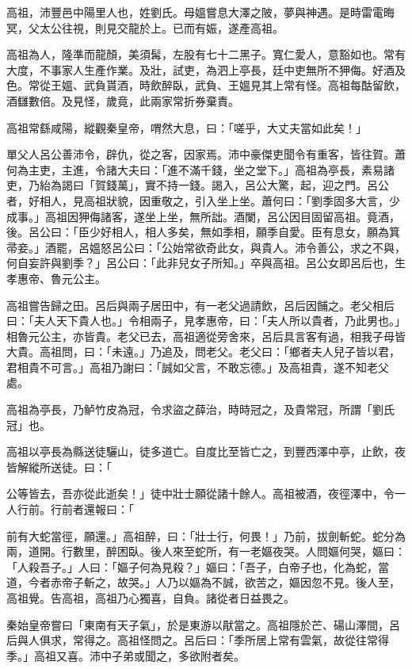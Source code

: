 
\begin{pinyinscope}
高祖，沛豐邑中陽里人也，姓劉氏。母媼嘗息大澤之陂，夢與神遇。是時雷電晦冥，父太公往視，則見交龍於上。已而有娠，遂產高祖。

高祖為人，隆準而龍顏，美須髯，左股有七十二黑子。寬仁愛人，意豁如也。常有大度，不事家人生產作業。及壯，試吏，為泗上亭長，廷中吏無所不狎侮。好酒及色。常從王媼、武負貰酒，時飲醉臥，武負、王媼見其上常有怪。高祖每酤留飲，酒讎數倍。及見怪，歲竟，此兩家常折券棄責。

高祖常繇咸陽，縱觀秦皇帝，喟然大息，曰：「嗟乎，大丈夫當如此矣！」

單父人呂公善沛令，辟仇，從之客，因家焉。沛中豪傑吏聞令有重客，皆往賀。蕭何為主吏，主進，令諸大夫曰：「進不滿千錢，坐之堂下。」高祖為亭長，素易諸吏，乃紿為謁曰「賀錢萬」，實不持一錢。謁入，呂公大驚，起，迎之門。呂公者，好相人，見高祖狀貌，因重敬之，引入坐上坐。蕭何曰：「劉季固多大言，少成事。」高祖因狎侮諸客，遂坐上坐，無所詘。酒闌，呂公因目固留高祖。竟酒，後。呂公曰：「臣少好相人，相人多矣，無如季相，願季自愛。臣有息女，願為箕帚妾。」酒罷，呂媼怒呂公曰：「公始常欲奇此女，與貴人。沛令善公，求之不與，何自妄許與劉季？」呂公曰：「此非兒女子所知。」卒與高祖。呂公女即呂后也，生孝惠帝、魯元公主。

高祖嘗告歸之田。呂后與兩子居田中，有一老父過請飲，呂后因餔之。老父相后曰：「夫人天下貴人也。」令相兩子，見孝惠帝，曰：「夫人所以貴者，乃此男也。」相魯元公主，亦皆貴。老父已去，高祖適從旁舍來，呂后具言客有過，相我子母皆大貴。高祖問，曰：「未遠。」乃追及，問老父。老父曰：「鄉者夫人兒子皆以君，君相貴不可言。」高祖乃謝曰：「誠如父言，不敢忘德。」及高祖貴，遂不知老父處。

高祖為亭長，乃鲈竹皮為冠，令求盜之薛治，時時冠之，及貴常冠，所謂「劉氏冠」也。

高祖以亭長為縣送徒驪山，徒多道亡。自度比至皆亡之，到豐西澤中亭，止飲，夜皆解縱所送徒。曰：「

公等皆去，吾亦從此逝矣！」徒中壯士願從諸十餘人。高祖被酒，夜徑澤中，令一人行前。行前者還報曰：「

前有大蛇當徑，願還。」高祖醉，曰：「壯士行，何畏！」乃前，拔劍斬蛇。蛇分為兩，道開。行數里，醉困臥。後人來至蛇所，有一老嫗夜哭。人問嫗何哭，嫗曰：「人殺吾子。」人曰：「嫗子何為見殺？」嫗曰：「吾子，白帝子也，化為蛇，當道，今者赤帝子斬之，故哭。」人乃以嫗為不誠，欲苦之，嫗因忽不見。後人至，高祖覺。告高祖，高祖乃心獨喜，自負。諸從者日益畏之。

秦始皇帝嘗曰「東南有天子氣」，於是東游以猒當之。高祖隱於芒、碭山澤間，呂后與人俱求，常得之。高祖怪問之。呂后曰：「季所居上常有雲氣，故從往常得季。」高祖又喜。沛中子弟或聞之，多欲附者矣。


\end{pinyinscope}
